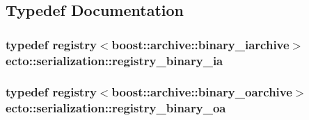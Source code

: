 \subsection{\-Typedef \-Documentation}
\hypertarget{namespaceecto_1_1serialization_a465425ff3a756de86571c1262f22d2ba}{
\subsubsection[{registry\-\_\-binary\-\_\-ia}]{\setlength{\rightskip}{0pt plus 5cm}typedef {\bf registry}$<$boost\-::archive\-::binary\-\_\-iarchive$>$ {\bf ecto\-::serialization\-::registry\-\_\-binary\-\_\-ia}}}\label{namespaceecto_1_1serialization_a465425ff3a756de86571c1262f22d2ba}
\hypertarget{namespaceecto_1_1serialization_ad544c8b5416e0ecfe692922b2f2e8e54}{
\subsubsection[{registry\-\_\-binary\-\_\-oa}]{\setlength{\rightskip}{0pt plus 5cm}typedef {\bf registry}$<$boost\-::archive\-::binary\-\_\-oarchive$>$ {\bf ecto\-::serialization\-::registry\-\_\-binary\-\_\-oa}}}\label{namespaceecto_1_1serialization_ad544c8b5416e0ecfe692922b2f2e8e54}


